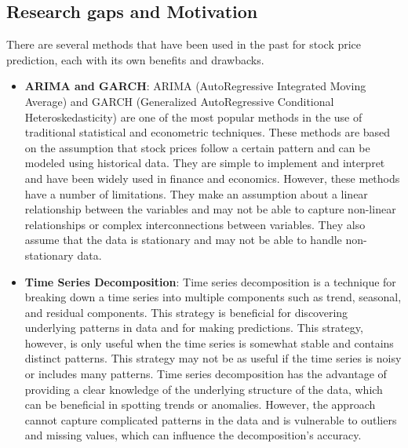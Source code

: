 \documentclass[a4paper]{article}
\begin{document}
\subsection{Research gaps and Motivation}
There are several methods that have been used in the past for stock price prediction, each with its own benefits and drawbacks.
\begin{itemize}[leftmargin=7.5pt]
    \item \textbf{ARIMA and GARCH}: ARIMA (AutoRegressive Integrated Moving Average) and GARCH (Generalized AutoRegressive Conditional Heteroskedasticity) are one of the most popular methods in the use of traditional statistical and econometric techniques. These methods are based on the assumption that stock prices follow a certain pattern and can be modeled using historical data. They are simple to implement and interpret and have been widely used in finance and economics. However, these methods have a number of limitations. They make an assumption about a linear relationship between the variables and may not be able to capture non-linear relationships or complex interconnections between variables. They also assume that the data is stationary and may not be able to handle non-stationary data.
    
    \item \textbf{Time Series Decomposition}: Time series decomposition is a technique for breaking down a time series into multiple components such as trend, seasonal, and residual components. This strategy is beneficial for discovering underlying patterns in data and for making predictions. This strategy, however, is only useful when the time series is somewhat stable and contains distinct patterns. This strategy may not be as useful if the time series is noisy or includes many patterns. Time series decomposition has the advantage of providing a clear knowledge of the underlying structure of the data, which can be beneficial in spotting trends or anomalies. However, the approach cannot capture complicated patterns in the data and is vulnerable to outliers and missing values, which can influence the decomposition's accuracy.
    

\end{itemize}
\end{document}

